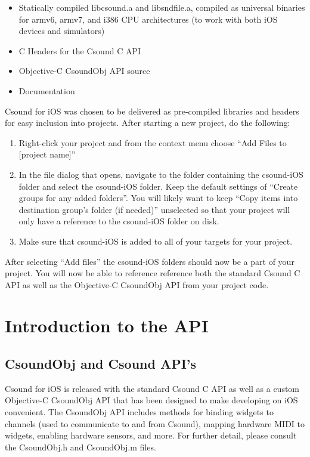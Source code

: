 \documentclass[11pt]{article}
\begin{document}
\begin{itemize}
\item Statically compiled libcsound.a and libsndfile.a, compiled as universal binaries for armv6, armv7, and i386 CPU architectures (to work with both iOS devices and simulators)
\item C Headers for the Csound C API
\item Objective-C CsoundObj API source
\item Documentation
\end{itemize} 

Csound for iOS was chosen to be delivered as pre-compiled libraries and headers for easy inclusion into projects.  After starting a new project, do the following:

\begin{enumerate}
\item Right-click your project and from the context menu choose ``Add Files to [project name]''
\item In the file dialog that opens, navigate to the folder containing the csound-iOS folder and select the csound-iOS folder. Keep the default settings of ``Create groups for any added folders''.  You will likely want to keep ``Copy items into destination group's folder (if needed)'' unselected so that your project will only have a reference to the csound-iOS folder on disk.
\item Make sure that csound-iOS is added to all of your targets for your project.
\end{enumerate}

After selecting ``Add files'' the csound-iOS folders should now be a part of your project.  You will now be able to reference reference both the standard Csound C API as well as the Objective-C CsoundObj API from your project code.


\section{Introduction to the API}
\subsection{CsoundObj and Csound API's}

Csound for iOS is released with the standard Csound C API as well as a custom Objective-C CsoundObj API that has been designed to make developing on iOS convenient.  The CsoundObj API includes methods for binding widgets to channels (used to communicate to and from Csound), mapping hardware MIDI to widgets, enabling hardware sensors, and more.  For further detail, please consult the CsoundObj.h and CsoundObj.m files.
\end{document}
